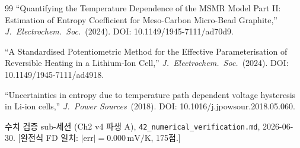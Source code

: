 \documentclass[11pt,a4paper]{article}
\begin{document}
\begin{thebibliography}{99}
``Quantifying the Temperature Dependence of the MSMR Model Part II:
Estimation of Entropy Coefficient for Meso-Carbon Micro-Bead Graphite,''
\emph{J.\ Electrochem.\ Soc.}\ (2024).
DOI: 10.1149/1945-7111/ad70d9.

``A Standardised Potentiometric Method for the Effective Parameterisation
of Reversible Heating in a Lithium-Ion Cell,''
\emph{J.\ Electrochem.\ Soc.}\ (2024).
DOI: 10.1149/1945-7111/ad4918.

``Uncertainties in entropy due to temperature path dependent voltage
hysteresis in Li-ion cells,''
\emph{J.\ Power Sources}\ (2018).
DOI: 10.1016/j.jpowsour.2018.05.060.

수치 검증 sub-세션 (Ch2 v4 파생 A),
\texttt{42\_numerical\_verification.md}, 2026-06-30.
[완전식 FD 일치: $|\mathrm{err}|=0.000\,\mathrm{mV/K}$, 175점.]

\end{thebibliography}
\end{document}
